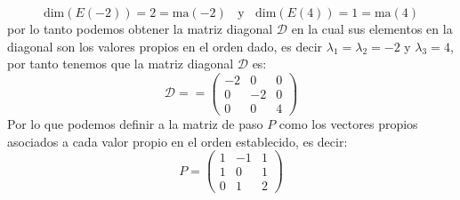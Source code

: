 \begin{itemize}
    \[\text{dim}(E(-2))=2=\text{ma}(-2)~~~~\text{y}~~~~\text{dim}(E(4))=1=\text{ma}(4)\]
    por lo tanto podemos obtener la matriz diagonal $\mathcal{D}$ en la cual sus elementos en la diagonal son los valores propios en el orden dado, es decir $\lambda_1=\lambda_2=-2$ y $\lambda_3=4$, por tanto tenemos que la matriz diagonal $\mathcal{D}$ es:
    $$\mathcal{D}==\begin{pmatrix}-2&0&0\\ 0&-2&0\\ 0&0&4\end{pmatrix}$$
   Por lo que podemos definir a la matriz de paso $P$ como los vectores propios asociados a cada valor propio en el orden establecido, es decir:
    $$P=\begin{pmatrix}1&-1&1\\ 1&0&1\\ 0&1&2\end{pmatrix}$$
    

\end{itemize}
